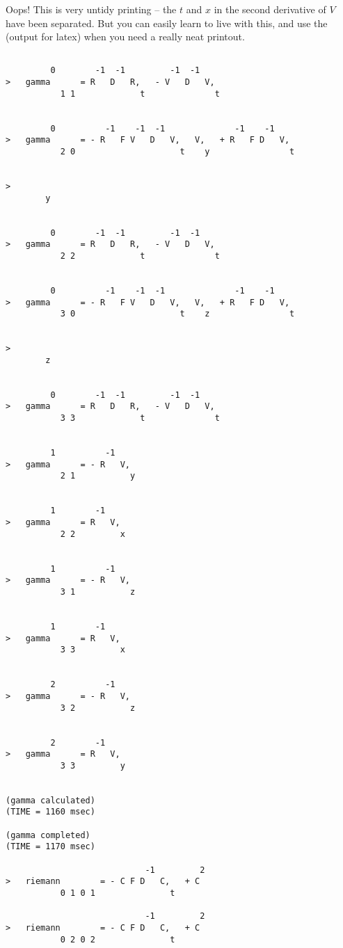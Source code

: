\bigskip

\noindent Oops! This is very untidy printing -- the $t$ and $x$ in the second
derivative of $V$ have been separated. But you can easily learn to live with
this, and use the (output for latex) when you need a really neat printout.

\bigskip

\begin{verbatim}

         0        -1  -1         -1  -1
>   gamma      = R   D   R,   - V   D   V,
           1 1             t              t


         0          -1    -1  -1              -1    -1
>   gamma      = - R   F V   D   V,   V,   + R   F D   V,
           2 0                     t    y                t


>
        y


         0        -1  -1         -1  -1
>   gamma      = R   D   R,   - V   D   V,
           2 2             t              t


         0          -1    -1  -1              -1    -1
>   gamma      = - R   F V   D   V,   V,   + R   F D   V,
           3 0                     t    z                t


>
        z


         0        -1  -1         -1  -1
>   gamma      = R   D   R,   - V   D   V,
           3 3             t              t


         1          -1
>   gamma      = - R   V,
           2 1           y


         1        -1
>   gamma      = R   V,
           2 2         x


         1          -1
>   gamma      = - R   V,
           3 1           z


         1        -1
>   gamma      = R   V,
           3 3         x


         2          -1
>   gamma      = - R   V,
           3 2           z


         2        -1
>   gamma      = R   V,
           3 3         y


(gamma calculated)
(TIME = 1160 msec)

(gamma completed)
(TIME = 1170 msec)

                            -1         2
>   riemann        = - C F D   C,   + C
           0 1 0 1               t

                            -1         2
>   riemann        = - C F D   C,   + C
           0 2 0 2               t


\end{verbatim}
